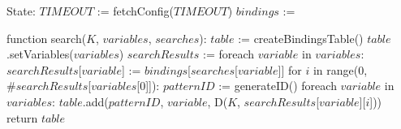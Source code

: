 State:
    $TIMEOUT$ := fetchConfig($TIMEOUT$)
    $bindings$ := {}

function search($K$, $variables$, $searches$):
    $table$ := createBindingsTable()
    $table$.setVariables($variables$)
    $searchResults$ := {}
    foreach $variable$ in $variables$:
        $searchResults$[$variable$] := $bindings$[$searches$[$variable$]]
    for $i$ in range(0, $\#searchResults$[$variables$[0]]):
        $patternID$ := generateID()
        foreach $variable$ in $variables$:
            $table$.add($patternID$, $variable$, D($K$, $searchResults$[$variable$][$i$]))
    return $table$